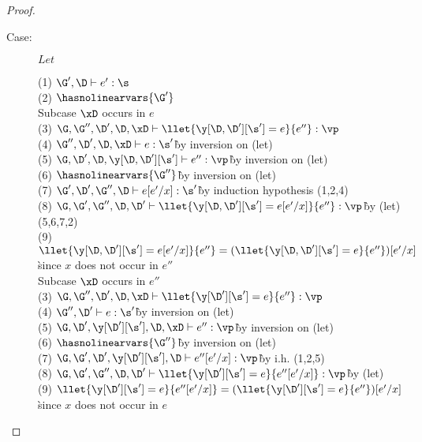 \begin{proof}
\begin{description}
\item[Case:] $Let$
\begin{tabbing}
    (1) $\G',\D \vdash e' : \s$\\
    (2) $\hasnolinearvars{\G'}$\\
    Subcase $\xD$ occurs in $e$\\
    (3) $\G, \G'', \D', \D, \xD \vdash \llet{\y[\D,\D'][\s'] = e}{e''} : \vp$\\
    (4) $\G'',\D', \D, \xD \vdash e : \s'$\` by inversion on (let)\\
    (5) $\G,\D',\D,\y[\D,\D'][\s'] \vdash e'' : \vp$\` by inversion on (let)\\
    (6) $\hasnolinearvars{\G''}$\` by inversion on (let)\\
    (7) $\G',\D',\G'',\D \vdash e[e'/x] : \s'$\` by induction hypothesis (1,2,4)\\
    (8) $\G,\G',\G'',\D,\D' \vdash \llet{\y[\D,\D'][\s'] = e[e'/x]}{e''} : \vp$\` by (let) (5,6,7,2)\\
    (9) $\llet{\y[\D,\D'][\s'] = e[e'/x]}{e''} = (\llet{\y[\D,\D'][\s'] = e}{e''})[e'/x]$\\\` since $x$ does not occur in $e''$\\
    Subcase $\xD$ occurs in $e''$\\
    (3) $\G, \G'', \D', \D, \xD \vdash \llet{\y[\D'][\s'] = e}{e''} : \vp$\\
    (4) $\G'',\D' \vdash e : \s'$\` by inversion on (let)\\
    (5) $\G,\D',\y[\D'][\s'],\D,\xD \vdash e'' : \vp$\` by inversion on (let)\\
    (6) $\hasnolinearvars{\G''}$\` by inversion on (let)\\
    (7) $\G,\G',\D',\y[\D'][\s'],\D \vdash e''[e'/x] : \vp$\` by i.h. (1,2,5)\\
    (8) $\G,\G',\G'',\D,\D' \vdash \llet{\y[\D'][\s'] = e}{e''[e'/x]} : \vp$\` by (let)\\
    (9) $\llet{\y[\D'][\s'] = e}{e''[e'/x]} = (\llet{\y[\D'][\s'] = e}{e''})[e'/x]$\\\` since $x$ does not occur in $e$\\
\end{tabbing}


\end{description}
\end{proof}
